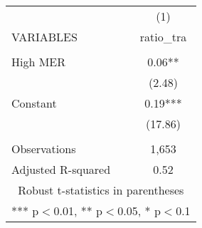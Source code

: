 \documentclass[]{article}
\begin{document}
\begin{tabular}{lc} \hline
 & (1) \\
VARIABLES & ratio\_tra \\ \hline
 &  \\
High MER & 0.06** \\
 & (2.48) \\
Constant & 0.19*** \\
 & (17.86) \\
 &  \\
Observations & 1,653 \\
 Adjusted R-squared & 0.52 \\ \hline
\multicolumn{2}{c}{ Robust t-statistics in parentheses} \\
\multicolumn{2}{c}{ *** p$<$0.01, ** p$<$0.05, * p$<$0.1} \\
\end{tabular}
\end{document}
